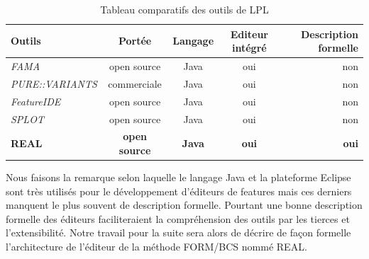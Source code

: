 \begin{table}[b]
\begin{tabular}{|l|c|c|c|r|}
  \hline
  \textbf{Outils} & \textbf{Portée} & \textbf{Langage} & \textbf{Editeur intégré} & \textbf{Description formelle} \\
	\hline
  \textsl{FAMA} & open source & Java & oui & non \\
  \hline
  \textsl{PURE::VARIANTS} & commerciale & Java & oui & non \\
	\hline
  \textsl{FeatureIDE} & open source & Java & oui & non \\
	\hline
  \textsl{SPLOT} & open source & Java & oui & non \\
	\hline
  \textbf{REAL} & \textbf{open source} & \textbf{Java} & \textbf{oui} & \textbf{oui} \\
  \hline
\end{tabular}
\caption{Tableau comparatifs des outils de LPL\label{time}} 
\end{table}

Nous faisons la remarque selon laquelle le langage Java et la plateforme Eclipse sont très utilisés pour le développement d'éditeurs de features mais ces derniers manquent le plus souvent de description formelle. Pourtant une bonne description formelle des éditeurs faciliteraient la compréhension des outils par les tierces et l'extensibilité. Notre travail pour la suite sera alors de décrire de façon formelle l'architecture de l'éditeur de la méthode FORM/BCS nommé REAL.

